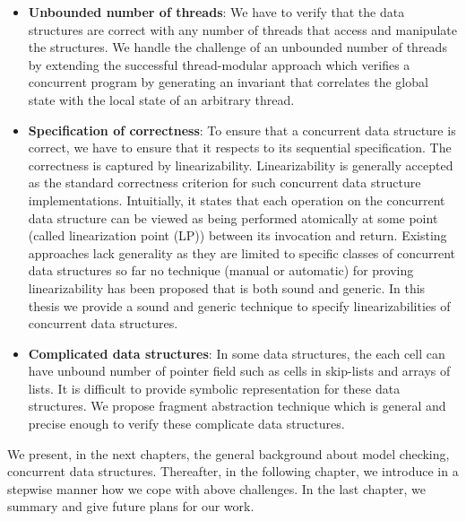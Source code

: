 \begin{itemize}
\item {\bf Unbounded number of threads}: We have to verify that the data structures are correct with any number of threads that access and manipulate the structures. We handle the challenge of an unbounded number of threads by extending the successful
thread-modular approach which verifies a concurrent program by generating
an invariant that correlates the global state with the local state of an arbitrary
thread.
\item {\bf Specification of correctness}: To ensure that a concurrent data structure is correct, we have to ensure that it respects to its sequential specification.  The correctness is captured by linearizability. Linearizability is generally accepted as the standard correctness criterion for such concurrent data structure implementations. Intuitially, it states that each operation on the concurrent data structure can be viewed as being performed atomically at some point (called linearization point (LP)) between its invocation and return. %
    Existing approaches lack generality as they are limited to specific classes of concurrent data structures so far no technique (manual or automatic) for proving linearizability has been proposed that is both sound and generic. In this thesis we provide a sound and generic technique to specify linearizabilities of concurrent data structures.
\item {\bf Complicated data structures}: In some data structures, the each cell can have unbound number of pointer field such as cells in skip-lists and arrays of lists. It is difficult to provide symbolic representation for these data structures.  We propose fragment abstraction technique which is general and precise enough to verify these complicate data structures.
\end{itemize}

We present, in the next chapters, the general background about model checking, concurrent data structures. Thereafter, in the following chapter, we introduce in a stepwise manner how
we cope with above challenges. In the last chapter, we summary and give future plans for our work.
